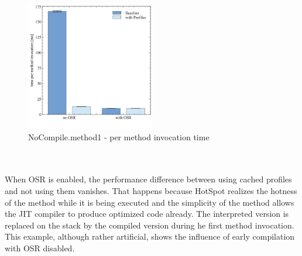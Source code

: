 \begin{figure}[ht]
  \begin{center}
    \centering
    \includegraphics[width=0.5\textwidth]{figures/nocompile.png}
    \caption{NoCompile.method1 - per method invocation time}
    \label{f:nocompile}
  \end{center}
\end{figure}
\\\\
When OSR is enabled, the performance difference between using cached profiles and not using them vanishes.
That happens because HotSpot realizes the hotness of the method while it is being executed and the simplicity of the method allows the JIT compiler to produce optimized code already. The interpreted version is replaced on the stack by the compiled version during he first method invocation. 
This example, although rather artificial, shows the influence of early compilation with OSR disabled.
